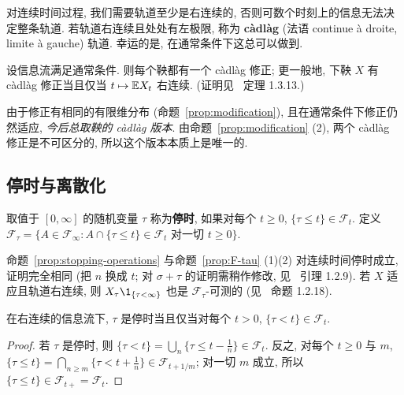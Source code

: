 对连续时间过程, 我们需要轨道至少是右连续的, 否则可数个时刻上的信息无法决定整条轨道. 若轨道右连续且处处有左极限, 称为 \textbf{c\`adl\`ag} (法语 continue \`a droite, limite \`a gauche) 轨道. 幸运的是, 在通常条件下这总可以做到.

\begin{theorem}[鞅的正则化]\label{thm:regularization}
设信息流满足通常条件. 则每个鞅都有一个 c\`adl\`ag 修正; 更一般地, 下鞅 $X$ 有 c\`adl\`ag 修正当且仅当 $t\mapsto\mathbb{E} X_t$ 右连续. (证明见~\cite{karatzas} 定理 1.3.13.)
\end{theorem}

由于修正有相同的有限维分布 (命题~\ref{prop:modification}), 且在通常条件下修正仍然适应, \emph{今后总取鞅的 c\`adl\`ag 版本}. 由命题~\ref{prop:modification} (2), 两个 c\`adl\`ag 修正是不可区分的, 所以这个版本本质上是唯一的.

\subsection{停时与离散化}

\begin{definition}[连续时间停时]\label{def:ct-stopping-time}
取值于 $[0,\infty]$ 的随机变量 $\tau$ 称为\textbf{停时}, 如果对每个 $t\ge0$, $\{\tau\le t\}\in\mathcal{F}_t$. 定义 $\mathcal{F}_\tau=\{A\in\mathcal{F}_\infty: A\cap\{\tau\le t\}\in\mathcal{F}_t\text{ 对一切 }t\ge0\}$.
\end{definition}

命题~\ref{prop:stopping-operations} 与命题~\ref{prop:F-tau} (1)(2) 对连续时间停时成立, 证明完全相同 (把 $n$ 换成 $t$; 对 $\sigma+\tau$ 的证明需稍作修改, 见~\cite{karatzas} 引理 1.2.9). 若 $X$ 适应且轨道右连续, 则 $X_\tau\1_{\{\tau<\infty\}}$ 也是 $\mathcal{F}_\tau$-可测的 (见~\cite{karatzas} 命题 1.2.18).

\begin{lemma}\label{lem:optional-time}
在右连续的信息流下, $\tau$ 是停时当且仅当对每个 $t>0$, $\{\tau<t\}\in\mathcal{F}_t$.
\end{lemma}

\begin{proof}
若 $\tau$ 是停时, 则 $\{\tau<t\}=\bigcup_n\{\tau\le t-\frac{1}{n}\}\in\mathcal{F}_t$. 反之, 对每个 $t\ge0$ 与 $m$, $\{\tau\le t\}=\bigcap_{n\ge m}\{\tau<t+\frac{1}{n}\}\in\mathcal{F}_{t+1/m}$; 对一切 $m$ 成立, 所以 $\{\tau\le t\}\in\mathcal{F}_{t+}=\mathcal{F}_t$.
\end{proof}

